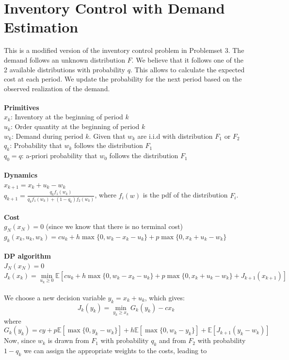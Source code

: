 \documentclass[11pt, oneside]{article}   	%
\begin{document}
\section{Inventory Control with Demand Estimation}
This is a modified version of the inventory control problem in Problemset 3. The demand follows an unknown distribution $F$. We believe that it follows one of the 2 available distributions with probability $q$. This allows to calculate the expected cost at each period. We update the probability for the next period based on the observed realization of the demand.\\
\\
\textbf{Primitives}\\
$x_k$: Inventory at the beginning of period $k$\\
$u_k$: Order quantity at the beginning of period $k$\\
$w_k$: Demand during period $k$. Given that $w_k$ are i.i.d with distribution $F_1$ or $F_2$\\
$q_k$: Probability that $w_k$ follows the distribution $F_1$\\
$q_0=q$: a-priori probability that $w_0$ follows the distribution $F_1$\\
\\
\textbf{Dynamics}\\
$x_{k+1} = x_k + u_k - w_k$\\
$q_{k+1}=\frac{q_kf_1(w_k)}{q_kf_1(w_k)+(1-q_k)f_2(w_k)}$, where $f_i(w)$ is the pdf of the distribution $F_i$.\\
\\
\textbf{Cost}\\
$g_N(x_N)=0$ \qquad \qquad (since we know that there is no terminal cost)\\
$g_k(x_k, u_k, w_k) = cu_k + h \max{\{0,w_k - x_k - u_k\}} + p \max{\{0, x_k + u_k - w_k\}}$\\
\\
\textbf{DP algorithm}\\
$J_N(x_N)=0$\\
$J_k(x_k)=\underset{u_k\geq 0}{\min}\mathbb{E}\left[cu_k+h\max\{0,w_k-x_k-u_k\}+p\max\{0,x_k+u_k-w_k\}+J_{k+1}(x_{k+1})\right]$\\
\\
We choose a new decision variable $y_k=x_k+u_k$, which gives: \\
$$J_k(y_k)=\underset{y_k\geq x_k}{\min}G_k(y_k)-cx_k$$ 
where 
$$G_k(y_k)=cy+p\mathbb{E}[\max\{0,y_k-w_k\}]+h\mathbb{E}[\max\{0,w_k-y_k\}]+\mathbb{E}[J_{k+1}(y_k-w_k)]$$
Now, since $w_k$ is drawn from $F_1$ with probability $q_k$ and from $F_2$ with probability $1-q_k$ we can assign the appropriate weights to the costs, leading to
\end{document}
